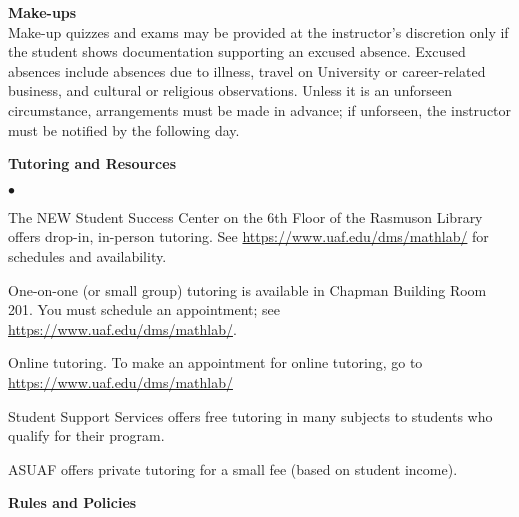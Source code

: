 \documentclass[12pt]{article}
\renewcommand{\emph}[1]{\textsf{\textbf{#1}}}
\newcommand{\localhead}[1]{\par\smallskip\textbf{#1}\nobreak\\}%
\def\heading#1{\localhead{\large\emph{#1}}}
\def\subheading#1{\localhead{\emph{#1}}}
\newenvironment{clist}%
{\bgroup\parskip 0pt\begin{list}{$\bullet$}{\partopsep 4pt\topsep 0pt\itemsep -2pt}}%
{\end{list}\egroup}%
\begin{document}
\heading{Make-ups}
Make-up quizzes and exams may be provided at the instructor's discretion only if
the student shows documentation supporting an excused absence. Excused
absences include absences due to illness, travel on University or
career-related business, and cultural or religious
observations. Unless it is an unforseen circumstance, arrangements
must be made in advance; if unforseen, the instructor must be notified
by the following day.

\heading{Tutoring and Resources}
\vskip -30pt\strut
\begin{clist}
	\item The NEW Student Success Center on the 6th Floor of the Rasmuson Library offers drop-in, in-person tutoring. 
	See \url{https://www.uaf.edu/dms/mathlab/} for schedules and availability.
	\item One-on-one (or small group) tutoring is available in 
Chapman Building Room 201. You must schedule an
appointment; see \url{https://www.uaf.edu/dms/mathlab/}.
	\item Online tutoring. To make an appointment for online tutoring, go to \url{https://www.uaf.edu/dms/mathlab/}
		\item Student Support Services offers free tutoring in many subjects to students who qualify for their program.
	\item ASUAF offers private tutoring for a small fee (based on student income).
\end{clist}

\heading{Rules and Policies}
\vskip -20pt

\end{document}
